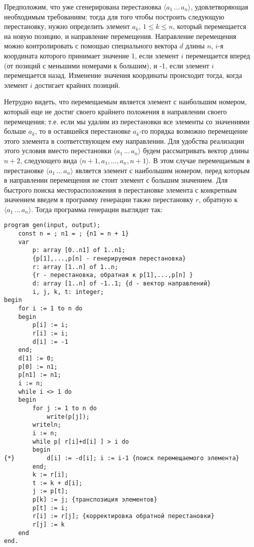 \documentclass[12pt,a4paper]{article}
\theoremstyle{plain}
\theoremstyle{definition}
\theoremstyle{remark}
\begin{document}
Предположим, что уже сгенерирована перестановка $\langle a_1\,\ldots\,a_n \rangle$, удовлетворяющая необходимым требованиям; тогда для того чтобы построить следующую перестановку, нужно определить элемент $a_k$, $1\le k\le n$, который перемещается на новую позицию, и направление перемещения. Направление перемещения можно контролировать с помощью специального вектора $d$ длины $n$, $i$-я координата которого принимает значение 1, если элемент $i$ перемещается вперед (от позиций с меньшими номерами к большим), и -1, если элемент $i$ перемещается назад. Изменение значения координаты происходит тогда, когда элемент $i$ достигает крайних позиций.

Нетрудно видеть, что перемещаемым является элемент с наибольшим номером, который еще не достиг своего крайнего положения в направлении своего перемещения; т.е. если мы удалим из перестановки все элементы со значениями больше $a_k$, то в оставшейся перестановке $a_k$-го порядка возможно перемещение этого элемента в соответствующем ему направлении. Для удобства реализации этого условия вместо перестановки $\langle a_1\,\ldots\,a_n\rangle$ будем рассматривать вектор длины $n+2$, следующего вида $\langle n+1,a_1,\ldots,a_n,n+1\rangle$. В этом случае перемещаемым в перестановке $\langle a_1\,\ldots\,a_n\rangle$ является элемент с наибольшим номером, перед которым в направлении перемещения не стоит элемент с большим значением. Для быстрого поиска месторасположения в перестановке элемента с конкретным значением
введем в программу генерации также перестановку $r$, обратную к $\langle a_1\,\ldots\,a_n\rangle$. Тогда программа генерации выглядит так:

\begin{verbatim}
program gen(input, output);
    const n = ; n1 = ; {n1 = n + 1}
    var
        p: array [0..n1] of 1..n1;
        {p[1],...,p[n] - генерируемая перестановка}
        r: array [1..n] of 1..n;
        {r - перестановка, обратная к p[1],...,p[n] }
        d: array [1..n] of -1..1; {d - вектор направлений}
        i, j, k, t: integer;
begin
    for i := 1 to n do
    begin
        p[i] := i;
        r[i] := i;
        d[i] := -1
    end;
    d[1] := 0;
    p[0] := n1;
    p[n1] := n1;
    i := n;
    while i <> 1 do
    begin
        for j := 1 to n do
            write(p[j]);
        writeln;
        i := n;
        while p[ r[i]+d[i] ] > i do
        begin
{*}         d[i] := -d[i]; i := i-1 {поиск перемещаемого элемента}
        end;
        k := r[i];
        t := k + d[i];
        j := p[t];
        p[k] := j; {транспозиция элементов}
        p[t] := i;
        r[i] := r[j]; {корректировка обратной перестановки}
        r[j] := k
    end
end.
\end{verbatim}
\end{document}
